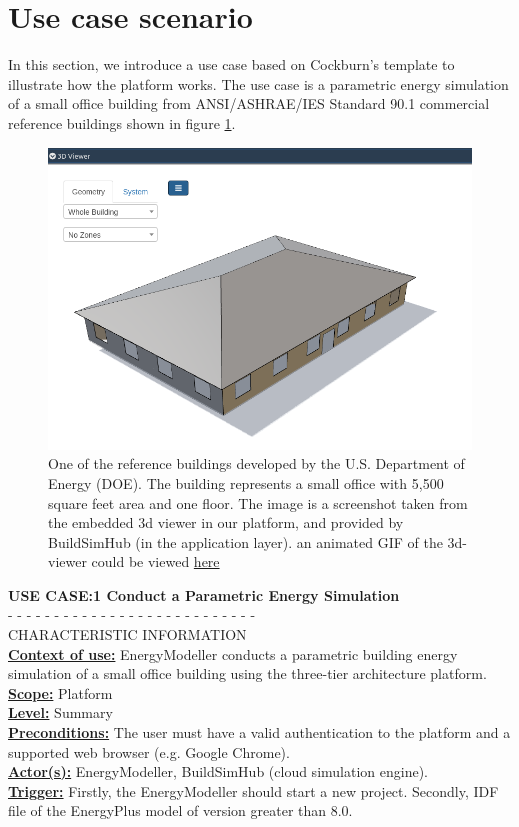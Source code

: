 \documentclass{scsSimAUDPaperFormat}
\begin{document}
\section{Use case scenario} \label{section:casestudy}
In this section, we introduce a use case based on Cockburn's template \cite{Cockburn1998UseTemplate}  to illustrate how the platform works. The use case is a parametric energy simulation of a small office building from ANSI/ASHRAE/IES Standard 90.1 commercial reference buildings \cite{Field2010UsingStudies} shown in figure \ref{fig:commrefbuild}.

\begin{figure}[h]
\includegraphics[width=\columnwidth]{paper_LateX/imgs/comm_ref_build.png}
\caption{One of the reference buildings developed by the U.S. Department of Energy (DOE). The building represents a small office with 5,500 square feet area and one floor. The image is a screenshot taken from the embedded 3d viewer in our platform, and provided by BuildSimHub (in the application layer). an animated GIF of the 3d-viewer could be viewed \href{https://user-images.githubusercontent.com/6969514/77833696-3eb1a600-717a-11ea-8f77-475be6d57cfb.gif}{here}}
\label{fig:commrefbuild}
\end{figure}
\textbf{USE CASE:1 Conduct a Parametric Energy Simulation}\\
- - - - - - - - - - - - - - - - - - - - - - - - - - - \\
CHARACTERISTIC INFORMATION\\
\textbf{\underline{Context of use:}} EnergyModeller conducts a parametric building energy simulation of a small office building using the three-tier architecture platform.\\
\textbf{\underline{Scope:}} Platform\\
\textbf{\underline{Level:}} Summary\\
\textbf{\underline{Preconditions:}} The user must have a valid authentication to the platform and a supported web browser (e.g. Google Chrome).\\
\textbf{\underline{Actor(s):}} EnergyModeller, BuildSimHub (cloud simulation engine).\\
\textbf{\underline{Trigger:}} Firstly, the EnergyModeller should start a new project. Secondly, IDF file of the EnergyPlus model of version greater than 8.0.
\end{document}
